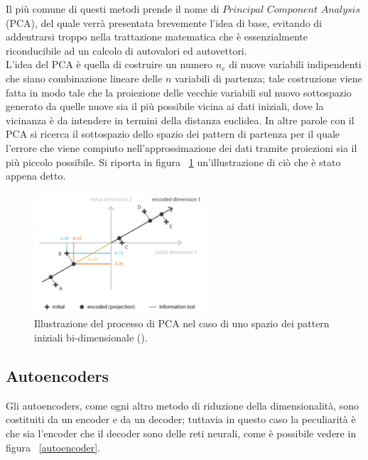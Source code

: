 Il più comune di questi metodi prende il nome di $\textit{Principal Component Analysis}$ (PCA), del quale verrà presentata brevemente l'idea di base, evitando di addentrarsi troppo nella trattazione matematica che è essenzialmente riconducibile ad un calcolo di autovalori ed autovettori. \\
L'idea del PCA è quella di costruire un numero $\textit{n}_\textit{e}$ di nuove variabili indipendenti che siano combinazione lineare delle $\textit{n}$ variabili di partenza; tale costruzione viene fatta in modo tale che la proiezione delle vecchie variabili sul nuovo sottospazio generato da quelle nuove sia il più possibile vicina ai dati iniziali, dove la vicinanza è da intendere in termini della distanza euclidea. In altre parole con il PCA si ricerca il sottospazio dello spazio dei pattern di partenza per il quale l'errore che viene compiuto nell'approssimazione dei dati tramite proiezioni sia il più piccolo possibile. Si riporta in figura ~\ref{PCA} un'illustrazione di ciò che è stato appena detto.
\\
\begin{figure}[h!]
	\centering
	\includegraphics[width=0.57\textwidth]{figs/PCA.png}
	\caption{Illustrazione del processo di PCA nel caso di uno spazio dei pattern iniziali bi-dimensionale (\cite{Understanding_VAEs}).}
	\label{PCA}
\end{figure}

\newpage

\subsection{Autoencoders}


\label{autoencoders}
Gli autoencoders, come ogni altro metodo di riduzione della dimensionalità, sono costituiti da un encoder e da un decoder; tuttavia in questo caso la peculiarità è che sia l'encoder che il decoder sono delle reti neurali, come è possibile vedere in figura ~\ref{autoencoder}. 


